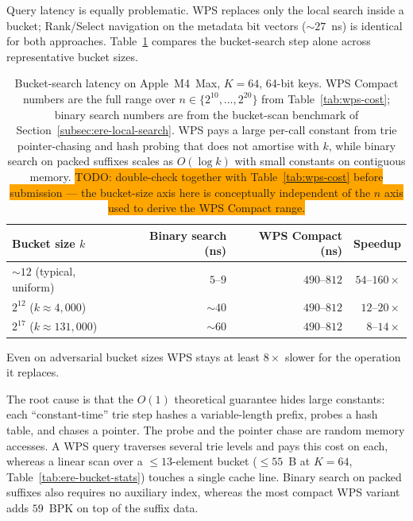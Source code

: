 Query latency is equally problematic. WPS replaces only the local search
inside a bucket; Rank/Select navigation on the metadata bit vectors
(${\sim}27$~ns) is identical for both approaches.
Table~\ref{tab:wps-vs-binsearch} compares the bucket-search step alone
across representative bucket sizes.

\begin{table}[H]
    \centering
    \begin{tabular}{@{}lrrr@{}}
        \toprule
        Bucket size $k$                  & Binary search (ns) & WPS Compact (ns) & Speedup            \\
        \midrule
        ${\sim}12$ (typical, uniform)    & $5$--$9$           & $490$--$812$     & $54$--$160\times$  \\
        $2^{12}$ ($k \approx 4{,}000$)   & ${\sim}40$         & $490$--$812$     & $12$--$20\times$   \\
        $2^{17}$ ($k \approx 131{,}000$) & ${\sim}60$         & $490$--$812$     & $8$--$14\times$    \\
        \bottomrule
    \end{tabular}
    \caption{Bucket-search latency on Apple~M4~Max, $K = 64$, 64-bit keys.
    WPS Compact numbers are the full range over $n \in \{2^{10}, \ldots, 2^{20}\}$
    from Table~\ref{tab:wps-cost}; binary search numbers are from the
    bucket-scan benchmark of Section~\ref{subsec:ere-local-search}.
    WPS pays a large per-call constant from trie pointer-chasing and hash
    probing that does not amortise with $k$, while binary search on packed
    suffixes scales as $O(\log k)$ with small constants on contiguous memory.
    \colorbox{orange}{TODO: double-check together with Table~\ref{tab:wps-cost}
        before submission --- the bucket-size axis here is conceptually
        independent of the $n$ axis used to derive the WPS Compact range.}}
    \label{tab:wps-vs-binsearch}
\end{table}

Even on adversarial bucket sizes WPS stays at least $8\times$ slower for
the operation it replaces.

The root cause is that the $O(1)$ theoretical guarantee hides large constants:
each ``constant-time'' trie step hashes a variable-length prefix, probes a
hash table, and chases a pointer. The probe and the pointer chase are random
memory accesses. A WPS query traverses several trie levels and pays this
cost on each, whereas a linear scan over a ${\leq}13$-element bucket
(${\leq}55$~B at $K = 64$, Table~\ref{tab:ere-bucket-stats}) touches a
single cache line. Binary search on packed suffixes also requires
no auxiliary index, whereas the most compact WPS variant adds $59$~BPK on
top of the suffix data.


